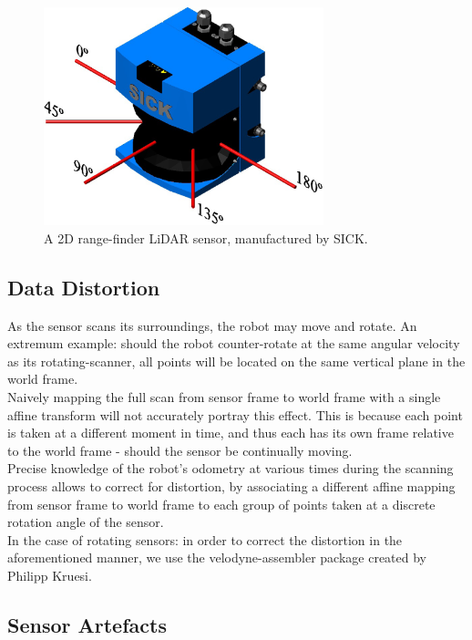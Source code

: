 \begin{figure}
  \centering
  \includegraphics[width=3.2in]{images/SICK.png}
  \caption{A 2D range-finder LiDAR sensor, manufactured by SICK.}
  \label{fig:sick}
\end{figure}

\subsection{Data Distortion}
\label{subsec:distortion}

As the sensor scans its surroundings, the robot may move and rotate. An extremum example: should the robot counter-rotate at the same angular velocity as its rotating-scanner, all points will be located on the same vertical plane in the world frame.\\

Naively mapping the full scan from sensor frame to world frame with a single affine transform will not accurately portray this effect. This is because each point is taken at a different moment in time, and thus each has its own frame relative to the world frame - should the sensor be continually moving.\\

Precise knowledge of the robot’s odometry at various times during the scanning process allows to correct for distortion, by associating a different affine mapping from sensor frame to world frame to each group of points taken at a discrete rotation angle of the sensor.\\

In the case of rotating sensors: in order to correct the distortion in the aforementioned manner, we use the velodyne-assembler package created by Philipp Kruesi.

\subsection{Sensor Artefacts}
\label{subsec:artefacts}

